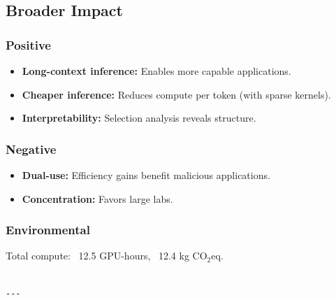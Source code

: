 \subsection{Broader Impact}

\subsubsection{Positive}
\begin{itemize}
\item \textbf{Long-context inference:} Enables more capable applications.
\item \textbf{Cheaper inference:} Reduces compute per token (with sparse kernels).
\item \textbf{Interpretability:} Selection analysis reveals structure.

\end{itemize}
\subsubsection{Negative}
\begin{itemize}
\item \textbf{Dual-use:} Efficiency gains benefit malicious applications.
\item \textbf{Concentration:} Favors large labs.

\end{itemize}
\subsubsection{Environmental}
Total compute: ~12.5 GPU-hours, ~12.4 kg CO$_2$eq.
\begin{lstlisting}

---
\end{lstlisting}